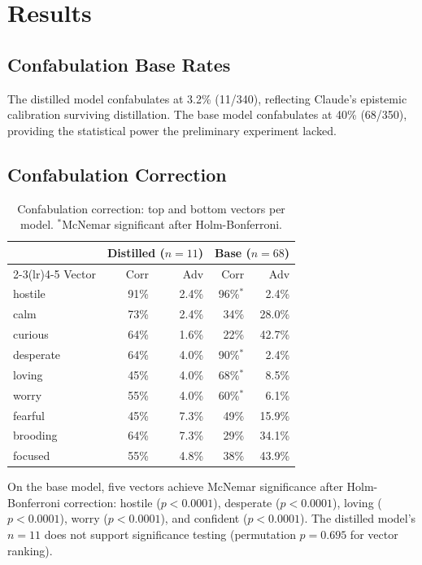 \documentclass[11pt,a4paper]{article}
\begin{document}
\section{Results}

\subsection{Confabulation Base Rates}

The distilled model confabulates at 3.2\% (11/340), reflecting Claude's
epistemic calibration surviving distillation. The base model confabulates
at 40\% (68/350), providing the statistical power the preliminary
experiment lacked.

\subsection{Confabulation Correction}

\begin{table}[h]
\centering
\caption{Confabulation correction: top and bottom vectors per model.
$^*$McNemar significant after Holm-Bonferroni.}
\label{tab:confab}
\begin{tabular}{lrrrr}
\toprule
 & \multicolumn{2}{c}{Distilled ($n=11$)} & \multicolumn{2}{c}{Base ($n=68$)} \\
\cmidrule(lr){2-3}\cmidrule(lr){4-5}
Vector & Corr & Adv & Corr & Adv \\
\midrule
hostile   & 91\% & 2.4\% & 96\%$^*$ & 2.4\% \\
calm      & 73\% & 2.4\% & 34\% & 28.0\% \\
curious   & 64\% & 1.6\% & 22\% & 42.7\% \\
desperate & 64\% & 4.0\% & 90\%$^*$ & 2.4\% \\
loving    & 45\% & 4.0\% & 68\%$^*$ & 8.5\% \\
worry     & 55\% & 4.0\% & 60\%$^*$ & 6.1\% \\
fearful   & 45\% & 7.3\% & 49\% & 15.9\% \\
brooding  & 64\% & 7.3\% & 29\% & 34.1\% \\
focused   & 55\% & 4.8\% & 38\% & 43.9\% \\
\bottomrule
\end{tabular}
\end{table}

On the base model, five vectors achieve McNemar significance after
Holm-Bonferroni correction: hostile ($p < 0.0001$), desperate
($p < 0.0001$), loving ($p < 0.0001$), worry ($p < 0.0001$), and
confident ($p < 0.0001$). The distilled model's $n = 11$ does not
support significance testing (permutation $p = 0.695$ for vector
ranking).
\end{document}
